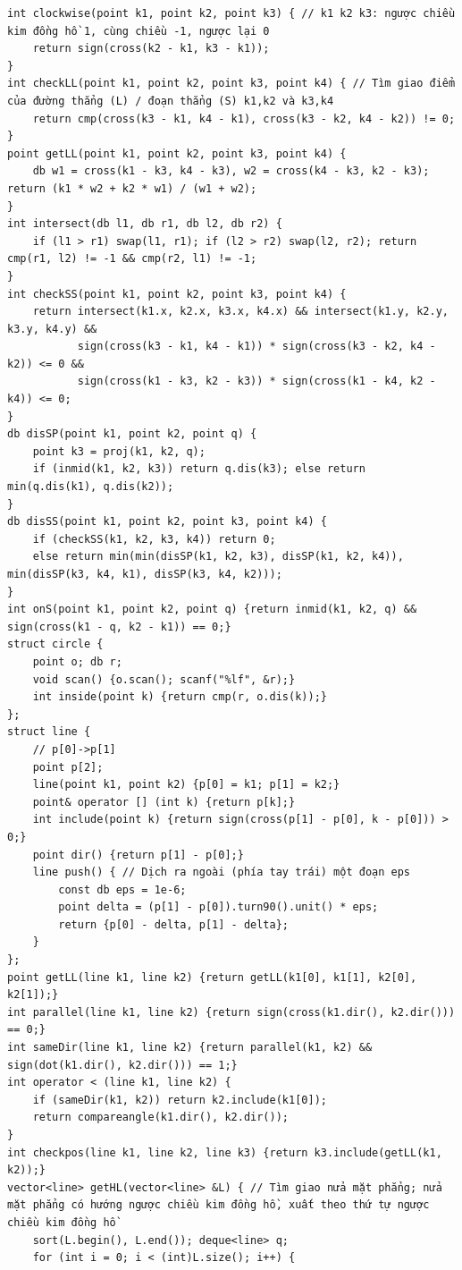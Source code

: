 \documentclass[11pt]{article}
\begin{document}
\begin{verbatim}
int clockwise(point k1, point k2, point k3) { // k1 k2 k3: ngược chiều kim đồng hồ 1, cùng chiều -1, ngược lại 0
	return sign(cross(k2 - k1, k3 - k1));
}
int checkLL(point k1, point k2, point k3, point k4) { // Tìm giao điểm của đường thẳng (L) / đoạn thẳng (S) k1,k2 và k3,k4
	return cmp(cross(k3 - k1, k4 - k1), cross(k3 - k2, k4 - k2)) != 0;
}
point getLL(point k1, point k2, point k3, point k4) {
	db w1 = cross(k1 - k3, k4 - k3), w2 = cross(k4 - k3, k2 - k3); return (k1 * w2 + k2 * w1) / (w1 + w2);
}
int intersect(db l1, db r1, db l2, db r2) {
	if (l1 > r1) swap(l1, r1); if (l2 > r2) swap(l2, r2); return cmp(r1, l2) != -1 && cmp(r2, l1) != -1;
}
int checkSS(point k1, point k2, point k3, point k4) {
	return intersect(k1.x, k2.x, k3.x, k4.x) && intersect(k1.y, k2.y, k3.y, k4.y) &&
	       sign(cross(k3 - k1, k4 - k1)) * sign(cross(k3 - k2, k4 - k2)) <= 0 &&
	       sign(cross(k1 - k3, k2 - k3)) * sign(cross(k1 - k4, k2 - k4)) <= 0;
}
db disSP(point k1, point k2, point q) {
	point k3 = proj(k1, k2, q);
	if (inmid(k1, k2, k3)) return q.dis(k3); else return min(q.dis(k1), q.dis(k2));
}
db disSS(point k1, point k2, point k3, point k4) {
	if (checkSS(k1, k2, k3, k4)) return 0;
	else return min(min(disSP(k1, k2, k3), disSP(k1, k2, k4)), min(disSP(k3, k4, k1), disSP(k3, k4, k2)));
}
int onS(point k1, point k2, point q) {return inmid(k1, k2, q) && sign(cross(k1 - q, k2 - k1)) == 0;}
struct circle {
	point o; db r;
	void scan() {o.scan(); scanf("%lf", &r);}
	int inside(point k) {return cmp(r, o.dis(k));}
};
struct line {
	// p[0]->p[1]
	point p[2];
	line(point k1, point k2) {p[0] = k1; p[1] = k2;}
	point& operator [] (int k) {return p[k];}
	int include(point k) {return sign(cross(p[1] - p[0], k - p[0])) > 0;}
	point dir() {return p[1] - p[0];}
	line push() { // Dịch ra ngoài (phía tay trái) một đoạn eps
		const db eps = 1e-6;
		point delta = (p[1] - p[0]).turn90().unit() * eps;
		return {p[0] - delta, p[1] - delta};
	}
};
point getLL(line k1, line k2) {return getLL(k1[0], k1[1], k2[0], k2[1]);}
int parallel(line k1, line k2) {return sign(cross(k1.dir(), k2.dir())) == 0;}
int sameDir(line k1, line k2) {return parallel(k1, k2) && sign(dot(k1.dir(), k2.dir())) == 1;}
int operator < (line k1, line k2) {
	if (sameDir(k1, k2)) return k2.include(k1[0]);
	return compareangle(k1.dir(), k2.dir());
}
int checkpos(line k1, line k2, line k3) {return k3.include(getLL(k1, k2));}
vector<line> getHL(vector<line> &L) { // Tìm giao nửa mặt phẳng; nửa mặt phẳng có hướng ngược chiều kim đồng hồ, xuất theo thứ tự ngược chiều kim đồng hồ
	sort(L.begin(), L.end()); deque<line> q;
	for (int i = 0; i < (int)L.size(); i++) {

\end{verbatim}
\end{document}
